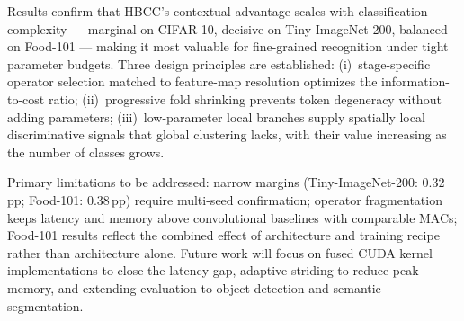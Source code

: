 \documentclass[conference]{IEEEtran}
\begin{document}
Results confirm that HBCC's contextual advantage scales with
classification complexity --- marginal on CIFAR-10, decisive on
Tiny-ImageNet-200, balanced on Food-101 --- making it most valuable
for fine-grained recognition under tight parameter budgets.
Three design principles are established: (i)~stage-specific operator
selection matched to feature-map resolution optimizes the
information-to-cost ratio; (ii)~progressive fold shrinking prevents
token degeneracy without adding parameters; (iii)~low-parameter local
branches supply spatially local discriminative signals that global
clustering lacks, with their value increasing as the number of classes
grows.

Primary limitations to be addressed: narrow margins
(Tiny-ImageNet-200: 0.32\,pp; Food-101: 0.38\,pp) require multi-seed
confirmation; operator fragmentation keeps latency and memory above
convolutional baselines with comparable MACs; Food-101 results reflect
the combined effect of architecture and training recipe rather than
architecture alone. Future work will focus on fused CUDA kernel
implementations to close the latency gap, adaptive striding to reduce
peak memory, and extending evaluation to object detection and semantic
segmentation.



\end{document}
